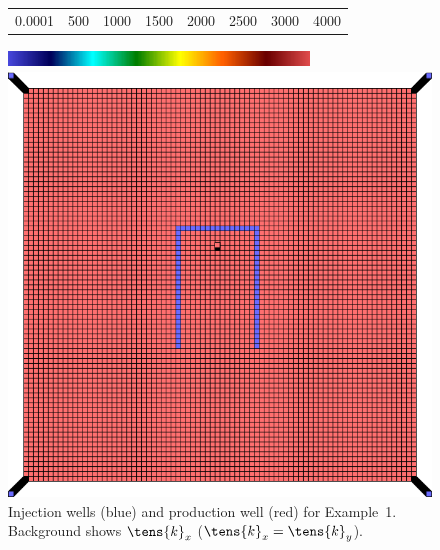 \begin{figure}[ht]
\begin{center}
     \begin{tabular}{cccccccc}
      0.0001 &  500 & 1000 & 1500 & 2000 & 2500 & 3000 &4000
      \end{tabular}
      \includegraphics[width=8cm, height=0.5cm]{figures/VanEssenModelPermeabilityMapColorBar.png}
       
       \medskip

       \includegraphics[totalheight=3.in]{figures/PiPermeabilityMapAndWells.png} 
       \end{center}
     \caption{Injection wells (blue) and production well (red) for Example~1. Background shows $\tens{k}_x$ ($ \tens{k}_x = \tens{k}_y$).}
  \label{fig:PImodelPermeabilityMapAndWells}
\end{figure}



